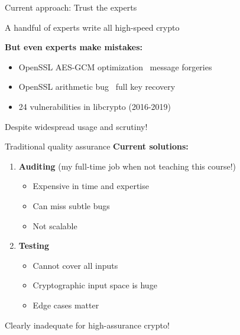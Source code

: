 \documentclass[aspectratio=169, lualatex, handout]{beamer}
\begin{document}
\begin{frame}{Current approach: Trust the experts}
	\begin{center}
		\Large
		A handful of experts write all high-speed crypto
	\end{center}
	\vspace{1em}
	\textbf{But even experts make mistakes:}
	\begin{itemize}
		\item OpenSSL AES-GCM optimization \rightarrow\ message forgeries
		\item OpenSSL arithmetic bug \rightarrow\ full key recovery
		\item 24 vulnerabilities in libcrypto (2016-2019)
	\end{itemize}
	\vspace{0.5em}
	\begin{center}
		Despite widespread usage and scrutiny!
	\end{center}
\end{frame}

\begin{frame}{Traditional quality assurance}
	\textbf{Current solutions:}
	\vspace{0.5em}
	\begin{enumerate}
		\item \textbf{Auditing} (my full-time job when not teaching this course!)
		      \begin{itemize}
			      \item Expensive in time and expertise
			      \item Can miss subtle bugs
			      \item Not scalable
		      \end{itemize}
		      \vspace{0.5em}
		\item \textbf{Testing}
		      \begin{itemize}
			      \item Cannot cover all inputs
			      \item Cryptographic input space is huge
			      \item Edge cases matter
		      \end{itemize}
	\end{enumerate}
	\vspace{1em}
	\begin{center}
		\Large
		Clearly inadequate for high-assurance crypto!
	\end{center}
\end{frame}
\end{document}

